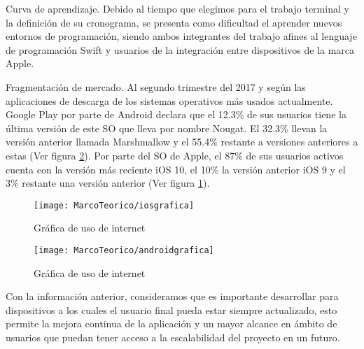 	Curva de aprendizaje.
	Debido al tiempo que elegimos para el trabajo terminal y la definición de su cronograma, se presenta como dificultad el aprender nuevos entornos de programación, siendo ambos integrantes del trabajo afines al lenguaje de programación Swift y usuarios de la integración entre dispositivos de la marca Apple.
	
	Fragmentación de mercado.
	Al segundo trimestre del 2017 y según las aplicaciones de descarga de los sistemas operativos más usados actualmente. Google Play por parte de Android declara que el 12.3\% de sus usuarios tiene la última versión de este SO que lleva por nombre Nougat. El 32.3\% llevan la versión anterior llamada Marshmallow y el 55.4\% restante a versiones anteriores a estas (Ver figura \ref{fig:graficaandroid}). \cite{10} Por parte del SO de Apple, el 87\% de sus usuarios activos cuenta con la versión más reciente iOS 10, el 10\% la versión anterior iOS 9 y el 3\% restante una versión anterior (Ver figura \ref{fig:graficaiost}). 
		\begin{figure}[ht]
		\centering
		\caption{Gráfica de uso de internet}
		\label{fig:graficaiost}
		\texttt{[image: MarcoTeorico/iosgrafica]}
	\end{figure}
\begin{figure}[ht]
	\centering
	\caption{Gráfica de uso de internet}
	\label{fig:graficaandroid}
	\texttt{[image: MarcoTeorico/androidgrafica]}
\end{figure}


	Con la información anterior, consideramos que es importante desarrollar para dispositivos a los cuales el usuario final pueda estar siempre actualizado, esto permite la mejora continua de la aplicación y un mayor alcance en ámbito de usuarios que puedan tener acceso a la escalabilidad del proyecto en un futuro.
